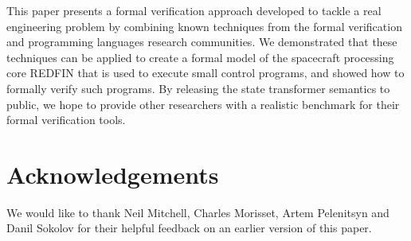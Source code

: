 This paper presents a formal verification approach developed to tackle a real
engineering problem by combining known techniques from the formal verification
and programming languages research communities. We demonstrated that these
techniques can be applied to create a formal model of the spacecraft processing
core REDFIN that is used to execute small control programs, and showed how to
formally verify such programs. By releasing the state transformer semantics to
public, we hope to provide other researchers with a realistic benchmark for
their formal verification tools.

\section*{Acknowledgements}
We would like to thank Neil Mitchell, Charles Morisset, Artem Pelenitsyn and
Danil Sokolov for their helpful feedback on an earlier version of this paper.
